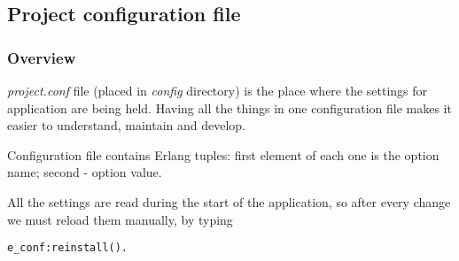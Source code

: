 \subsection{Project configuration file}
\subsubsection{Overview}{\it project.conf} file (placed in {\it config} directory) is the place where the settings for application are being held. Having all the things in one configuration file makes it easier to understand, maintain and develop. 

Configuration file contains Erlang tuples: first element of each one is the option name; second - option value. 

All the settings are read during the start of the application, so after every change we must reload them manually, by typing
\begin{verbatim}
e_conf:reinstall().
\end{verbatim}

